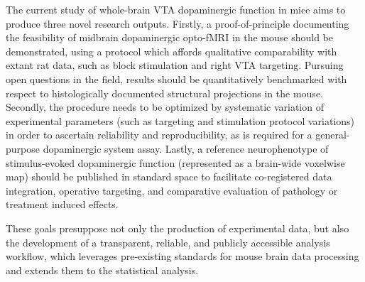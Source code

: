 The current study of whole-brain VTA dopaminergic function in mice aims to produce three novel research outputs.
Firstly, a proof-of-principle documenting the feasibility of midbrain dopaminergic opto-fMRI in the mouse should be demonstrated, using a protocol which affords qualitative comparability with extant rat data, such as block stimulation and right VTA targeting.
Pursuing open questions in the field, results should be quantitatively benchmarked with respect to histologically documented structural projections in the mouse.
Secondly, the procedure needs to be optimized by systematic variation of experimental parameters (such as targeting and stimulation protocol variations) in order to ascertain reliability and reproducibility, as is required for a general-purpose dopaminergic system assay.
Lastly, a reference neurophenotype of stimulus-evoked dopaminergic function (represented as a brain-wide voxelwise map) should be published in standard space to facilitate co-registered data integration, operative targeting, and comparative evaluation of pathology or treatment induced effects.

These goals presuppose not only the production of experimental data, but also the development of a transparent, reliable, and publicly accessible analysis workflow, which leverages pre-existing standards for mouse brain data processing \cite{irsabi} and extends them to the statistical analysis.
